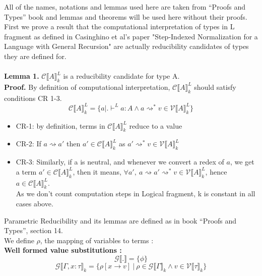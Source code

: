 \documentclass[12pt]{article}
\author{Ankit Kumar}
\newcommand{\sgarr}{\ensuremath{\rightsquigarrow{}}\xspace}
\newcommand{\llrr}[1]{\llbracket {#1} \rrbracket}
\begin{document}
All of the names, notations and lemmas used here are taken from ``Proofs and Types'' book and lemmas and theorems will be used here without their proofs.\\

First we prove a result that the computational interpretation of types
in L fragment as defined in Casinghino et al's paper "Step-Indexed Normalization for a
Language with General Recursion" are actually reducibility candidates
of types they are defined for.\\
\\
\textbf{Lemma 1.} $\mathscr{C}\llrr{A}^L_k$ is a reducibility candidate
for type A.\\
\textbf{Proof.} By definition of computational interpretation,
$\mathscr{C}\llrr{A}^L_k$ should satisfy conditions CR 1-3.\\
$$
\mathscr{C}\llrr{A}^L_k = \{a | . \vdash^L a:A \wedge a \sgarr^{*} v \in \mathscr{V}\llrr{A}^L_k\} 
$$
\begin{itemize}
\item{CR-1:} by definition, terms in $\mathscr{C}\llrr{A}^L_k$  reduce
  to a value
\item{CR-2:} If $a \sgarr a'$ then $a' \in \mathscr{C}\llrr{A}^L_k$ as $a' \sgarr^{*} v \in \mathscr{V}\llrr{A}^L_k$
\item{CR-3:} Similarly, if a is neutral, and whenever we convert a
  redex of $a$, we get a term $a' \in \mathscr{C}\llrr{A}^L_k$, then
  it means, $\forall a',\ a \sgarr a' \sgarr^{*} v \in \mathscr{V}\llrr{A}^L_k$, hence
  $a \in \mathscr{C}\llrr{A}^L_k$. \\
As we don't count computation steps in Logical fragment, k is constant
in all cases above.
\end{itemize} 
Parametric Reducibility and its lemmas are defined as in book ``Proofs and
Types'', section 14.\\

We define $\rho$, the mapping of variables to terms :\\
\textbf{Well formed value substitutions :}\\
$$
\mathcal{G}\llbracket . \rrbracket = \{\phi\}
$$
$$
\mathcal{G}\llrr{ \Gamma , x:\tau }_k = \{\rho [x
\rightarrow v]\ |\ \rho \in \mathcal{G}\llrr{ \Gamma
}_k \wedge v \in  \mathscr{V} \llrr{ \tau }_k \}
$$
\\
\end{document}
